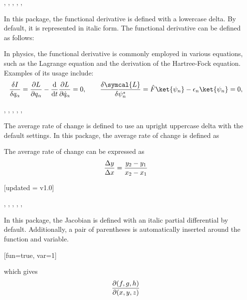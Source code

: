 \begin{function}{\fdv}
	\begin{syntax}
		\sarg, , , \targ{/}, , 
	\end{syntax}
	In this package, the functional derivative is defined with a lowercase delta. By default, it is represented in italic form. The functional derivative can be defined as follows:
	\begin{definition}
		\DeclareDerivative{\fdv}{\delta}
	\end{definition}
	
	\noindent In physics, the functional derivative is commonly employed in various equations, such as the Lagrange equation and the derivation of the Hartree-Fock equation. Examples of its usage include:
	\begin{equation*}
		\fdv{I}{q_{\alpha}} = \pdv{L}{q_{\alpha}} - \odv*{ \pdv{L}{ \dot{q}_{\alpha} } } { t } = 0, \qquad \fdv{ \symcal{L} }{ \psi_{n}^* } = \hat{F} \ket{\psi_{n}} - \epsilon_{n} \ket{\psi_{n}} = 0
		,
	\end{equation*}
\end{function}

\begin{function}{\adv}
	\begin{syntax}
		\sarg, , , \targ{/}, , \earg{\_, point\tsb{1}, \^, point\tsb{2}}
	\end{syntax}
	The average rate of change is defined to use an upright uppercase delta with the default settings. In this package, the average rate of change is defined as
	\begin{definition}
		\DeclareDerivative{\adv}{\Delta}
	\end{definition}
	
	\noindent The average rate of change can be expressed as
	\begin{equation*}
		\adv{ y }{ x } = \frac{y_2- y_1}{x_2 - x_1}
	\end{equation*}
\end{function}

\begin{function}{\jdv}[updated = v1.0]
	\begin{syntax}
		\sarg, , , \targ{/}, , 
	\end{syntax}
	In this package, the Jacobian is defined with an italic partial differential by default. Additionally, a pair of parentheses is automatically inserted around the function and variable.
	\begin{definition}
		\DeclareDerivative{\jdv}{\partial}[fun=true, var=1]
	\end{definition}
	
	\noindent which gives
	\begin{equation*}
		\jdv{f,g,h}{x,y,z}
	\end{equation*}
\end{function}


